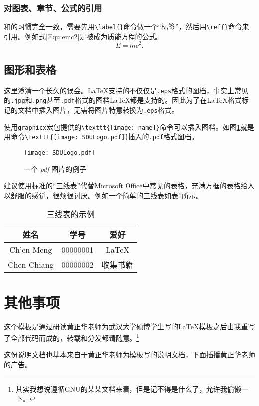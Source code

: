 \subsection{对图表、章节、公式的引用}
和\LaTeXe{}的习惯完全一致，需要先用\verb|\label{}|命令做一个“标签”，然后用\verb|\ref{}|命令来引用。例如式\ref{Equ:emc2}是被成为质能方程的公式。
\begin{equation}
E = m c^2.
\label{Equ:emc2}
\end{equation}
\section{图形和表格}
这里澄清一个长久的误会。\LaTeX{}支持的不仅仅是\texttt{.eps}格式的图档，事实上常见的\texttt{.jpg}和\texttt{.png}甚至\texttt{.pdf}格式的图档\LaTeX{}都是支持的。因此为了在\LaTeX{}格式标记的文档中插入图片，无需将图片特意转换为\texttt{.eps}格式。

使用\texttt{graphicx}宏包提供的\verb|\texttt{[image: name]}|命令可以插入图档。如图\ref{Fig:pdf}就是用命令\verb|\texttt{[image: SDULogo.pdf]}|插入的\texttt{.pdf}格式图档。
\begin{figure}
[htbp]
\centering
\texttt{[image: SDULogo.pdf]}
\caption{一个 \emph{pdf} 图片的例子}\label{Fig:pdf}
\end{figure}

建议使用标准的“三线表”代替Microsoft Office中常见的表格，充满方框的表格给人以舒服的感觉，很烦很讨厌。例如一个简单的三线表如表\ref{Tab:3lines}所示。
\begin{table}
[htbp]
\centering
\begin{tabular}
{ccc}
\toprule
姓名& 学号& 爱好\\
\hline
Ch'en Meng& 00000001& \LaTeX{}\\
Chen Chiang& 00000002& 收集书籍\\
\bottomrule
\end{tabular}
\caption{三线表的示例}\label{Tab:3lines}
\end{table}
\chapter{其他事项}
这个模板是通过研读黄正华老师为武汉大学硕博学生写的\LaTeX{}模板之后由我重写了全部代码而成的，转载和分发都请随意。\footnote{其实我想说遵循GNU的某某文档来着，但是记不得是什么了，允许我偷懒一下。}

这份说明文档也基本来自于黄正华老师为模板写的说明文档，下面插播黄正华老师的广告。

